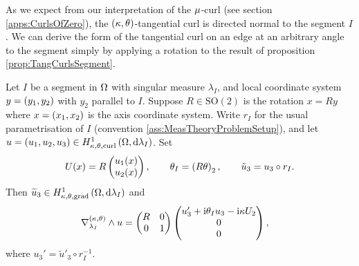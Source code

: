 As we expect from our interpretation of the $\mu$-curl (see section \ref{apps:CurlsOfZero}), the $\left( \kappa, \theta \right)$-tangential curl is directed normal to the segment $I$.
We can derive the form of the tangential curl on an edge at an arbitrary angle to the segment simply by applying a rotation to the result of proposition \ref{prop:TangCurlsSegment}.
\begin{cory} \label{cory:TangCurlRotated}
	Let $I$ be a segment in $\Omega$ with singular measure $\lambda_I$, and local coordinate system $y=\left( y_1, y_2 \right)$ with $y_2$ parallel to $I$.
	Suppose $R\in\mathrm{SO}(2)$ is the rotation $x=Ry$ where $x=\left( x_1, x_2 \right)$ is the axis coordinate system.
	Write $r_I$ for the usual parametrisation of $I$ (convention \ref{ass:MeasTheoryProblemSetup}), and let $u=\left( u_1,u_2,u_3 \right)\in H^1_{\kappa,\theta,\mathrm{curl}}\left( \Omega, \mathrm{d}\lambda_I \right)$.
	Set
	\begin{align*}
		U(x) = R \begin{pmatrix} u_1(x) \\ u_2(x) \end{pmatrix}, 
		\qquad \theta_I = \left(  R\theta  \right)_2,
		\qquad \tilde{u}_3 = u_3 \circ r_I.
	\end{align*}
	Then $\widetilde{u}_3\in H^1_{\kappa,\theta,\mathrm{grad}}\left( \Omega, \mathrm{d}\lambda_I \right)$ and 
	\begin{align*}
		\nabla_{\lambda_I}^{\left( \kappa, \theta \right)}\wedge u &= \begin{pmatrix} R & 0 \\ 0 & 1	\end{pmatrix}
		\begin{pmatrix} u_3' + \mathrm{i}\theta_I u_3 - \mathrm{i}\kappa U_2 \\ 0 \\ 0 \end{pmatrix},
	\end{align*}
	where $u_3' = \widetilde{u}'_3 \circ r_I^{-1}$.
\end{cory}

